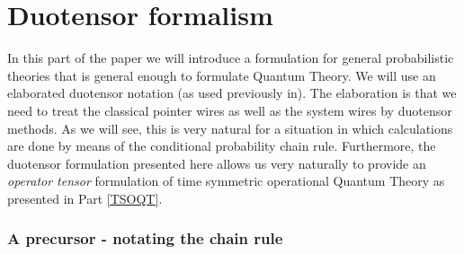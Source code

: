 \documentclass[10pt]{article}
\begin{document}
\part{Duotensor formalism}\label{part:duotensorformulation}

In this part of the paper we will introduce a formulation for general probabilistic theories that is general enough to formulate Quantum Theory.  We will use an elaborated duotensor notation (as used previously in\cite{hardy2010formalism}).   The elaboration is that we need to treat the classical pointer wires as well as the system wires by duotensor methods.  As we will see, this is very natural for a situation in which calculations are done by means of the conditional probability chain rule.  Furthermore, the duotensor formulation presented here allows us very naturally to provide an \emph{operator tensor} formulation of time symmetric operational Quantum Theory as presented in Part \ref{TSOQT}.

\section{A precursor - notating the chain rule}\label{sec:precursor}
\end{document}
